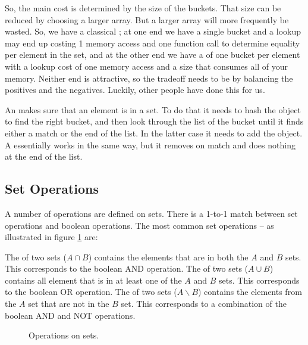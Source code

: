 So, the main cost is determined by the size of the buckets. That size can be reduced by choosing a larger array. But a larger array will more frequently be wasted. So, we have a classical ; at one end we have a single bucket and a lookup may end up costing 1 memory access and one function call to determine equality per element in the set, and at the other end we have a  of one bucket per element with a lookup cost of one memory access and a size that consumes all of your memory. Neither end is attractive, so the tradeoff needs to be  by balancing the positives and the negatives. Luckily, other people have done this for us.

An  makes sure that an element is in a set. To do that it needs to hash the object to find the right bucket, and then look through the list of the bucket until it finds either a match or the end of the list. In the latter case it needs to add the object. A  essentially works in the same way, but it removes on match and does nothing at the end of the list.

\subsection{Set Operations}

A number of operations are defined on sets. There is a 1-to-1 match between set operations and boolean operations. The most common set operations -- as illustrated in figure \ref{fig:collections:set:ops} are:

\begin{itemize}
   The  of two sets ($A \cap B$) contains the elements that are in both the $A$ and $B$ sets. This corresponds to the boolean AND operation.
   The  of two sets ($A \cup B$) contains all element that is in at least one of the $A$ and $B$ sets. This corresponds to the boolean OR operation.
   The  of two sets ($A \backslash B$) contains the elements from the $A$ set that are not in the $B$ set. This corresponds to a combination of the boolean AND and NOT operations.
\end{itemize}

\begin{figure}[tbp]
  
  \caption{Operations on sets.}
  \label{fig:collections:set:ops}
\end{figure}

